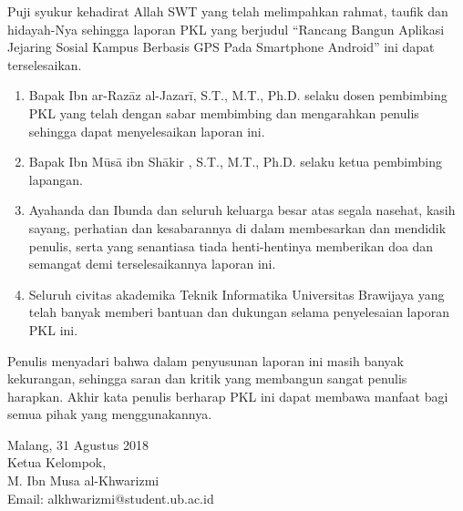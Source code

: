\documentclass{pkl}
\begin{document}
{\preface

  Puji syukur kehadirat Allah SWT yang telah melimpahkan
  rahmat, taufik dan hidayah-Nya sehingga laporan PKL yang berjudul
  “Rancang Bangun Aplikasi Jejaring Sosial Kampus Berbasis GPS Pada
  Smartphone Android” ini dapat terselesaikan.

  \begin{enumerate}
  \item{Bapak Ibn ar-Razāz al-Jazarī, S.T., M.T., Ph.D. selaku dosen pembimbing PKL
      yang telah dengan sabar membimbing dan mengarahkan penulis
      sehingga dapat menyelesaikan laporan ini.}
  \item{Bapak Ibn Mūsā ibn Shākir , S.T., M.T., Ph.D. selaku ketua pembimbing lapangan.}
  \item{Ayahanda dan Ibunda dan seluruh keluarga besar atas segala
      nasehat, kasih sayang, perhatian dan kesabarannya di dalam
      membesarkan dan mendidik penulis, serta yang senantiasa tiada
      henti-hentinya memberikan doa dan semangat demi terselesaikannya
      laporan ini.}
  \item{Seluruh civitas akademika Teknik Informatika Universitas
      Brawijaya yang telah banyak memberi bantuan dan dukungan selama
      penyelesaian laporan PKL ini.}
  \end{enumerate}

  Penulis menyadari bahwa dalam penyusunan laporan ini masih banyak kekurangan,
  sehingga saran dan kritik yang membangun sangat penulis harapkan. Akhir kata penulis
  berharap PKL ini dapat membawa manfaat bagi semua pihak yang menggunakannya.


  \vspace{0.8cm}


  \noindent
  \hspace*{8cm}Malang, 31 Agustus 2018 \\
  \hspace*{8cm}Ketua Kelompok, \vspace{1.5cm} \\

  \hspace*{6.8cm}M. Ibn Musa al-Khwarizmi \\
  \hspace*{8cm}Email: alkhwarizmi@student.ub.ac.id

}
\end{document}
